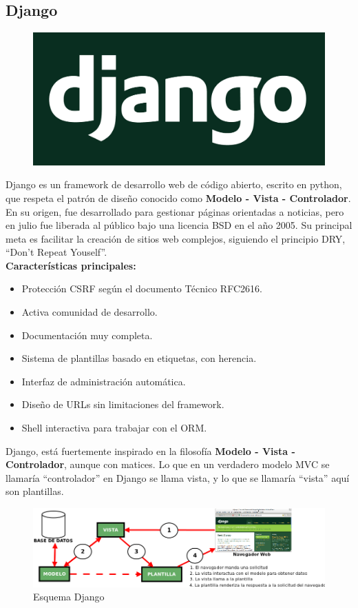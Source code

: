 \documentclass[a4paper, 12pt]{book}
\begin{document}
\subsection{Django}

\begin{figure}[hbtp]
\centering
\includegraphics[scale=0.1]{img/django-logo-negative.png}
\end{figure}  
Django es un framework de desarrollo web de código abierto, escrito en python, que respeta el patrón de diseño conocido como \textbf{Modelo - Vista - Controlador}. En su origen, fue desarrollado para gestionar páginas orientadas a noticias, pero en julio fue liberada al público bajo una licencia BSD en el año 2005.
Su principal meta es facilitar la creación de sitios web complejos, siguiendo el principio DRY, ``Don't Repeat Youself''. \\
\textbf{Características principales:}
\begin{itemize}
\item Protección CSRF según el documento Técnico RFC2616.
\item Activa comunidad de desarrollo.
\item Documentación muy completa.
\item Sistema de plantillas basado en etiquetas, con herencia.
\item Interfaz de administración automática.
\item Diseño de URLs sin limitaciones del framework.
\item Shell interactiva para trabajar con el ORM.
\end{itemize}
 
Django, está fuertemente inspirado en la filosofía \textbf{Modelo - Vista - Controlador}, aunque con matices. Lo que en un verdadero modelo MVC se llamaría ``controlador'' en Django se llama vista, y lo que se llamaría ``vista'' aquí son plantillas. 

\begin{figure}[hbtp]
\caption{Esquema Django}
\centering
\includegraphics[scale=0.4]{img/esquema-mtv.png}
\end{figure}
\end{document}
